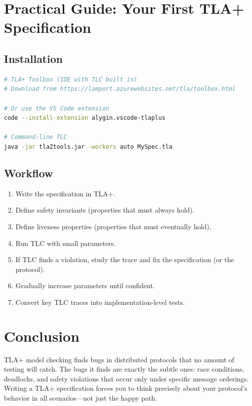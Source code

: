 \documentclass[11pt,a4paper]{article}
\begin{document}
\section{Practical Guide: Your First TLA+ Specification}

\subsection{Installation}

\begin{lstlisting}[language=bash,caption={Installing TLA+ tools}]
# TLA+ Toolbox (IDE with TLC built in)
# Download from https://lamport.azurewebsites.net/tla/toolbox.html

# Or use the VS Code extension
code --install-extension alygin.vscode-tlaplus

# Command-line TLC
java -jar tla2tools.jar -workers auto MySpec.tla
\end{lstlisting}

\subsection{Workflow}

\begin{enumerate}
  \item Write the specification in TLA+.
  \item Define safety invariants (properties that must always hold).
  \item Define liveness properties (properties that must eventually hold).
  \item Run TLC with small parameters.
  \item If TLC finds a violation, study the trace and fix the specification (or the protocol).
  \item Gradually increase parameters until confident.
  \item Convert key TLC traces into implementation-level tests.
\end{enumerate}

\section{Conclusion}

TLA+ model checking finds bugs in distributed protocols that no amount of testing will
catch. The bugs it finds are exactly the subtle ones: race conditions, deadlocks, and
safety violations that occur only under specific message orderings. Writing a TLA+
specification forces you to think precisely about your protocol's behavior in all
scenarios---not just the happy path.
\end{document}
